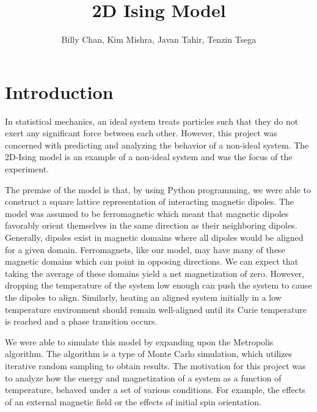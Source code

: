 \documentclass[11pt]{article}
\title{2D Ising Model}
\author{Billy Chan, Kim Mishra, Javan Tahir, Tenzin Tsega}
\newcommand\tab[1][.5cm]{\hspace*{#1}}
\begin{document}
\maketitle


\section{Introduction}
\label{sec:intro}
\tab In statistical mechanics, an ideal system treats particles such that they do not exert any significant force between each other. However, this project was concerned with predicting and analyzing the behavior of a non-ideal system. The 2D-Ising model is an example of a non-ideal system and was the focus of the experiment.

The premise of the model is that, by using Python programming, we were able to construct a square lattice representation of interacting magnetic dipoles. The model was assumed to be ferromagnetic which meant that magnetic dipoles favorably orient themselves in the same direction as their neighboring dipoles. Generally, dipoles exist in magnetic domains where all dipoles would be aligned for a given domain. Ferromagnets, like our model, may have many of these magnetic domains which can point in opposing directions. We can expect that taking the average of these domains yield a net magnetization of zero. However, dropping the temperature of the system low enough can push the system to cause the dipoles to align. Similarly, heating an aligned system initially in a low temperature environment should remain well-aligned until its Curie temperature is reached and a phase transition occurs.

We were able to simulate this model by expanding upon the Metropolis algorithm. The algorithm is a type of Monte Carlo simulation, which utilizes iterative random sampling to obtain results. The motivation for this project was to analyze how the energy and magnetization of a system as a function of temperature, behaved under a set of various conditions. For example, the effects of an external magnetic field or the effects of initial spin orientation.
\end{document}
